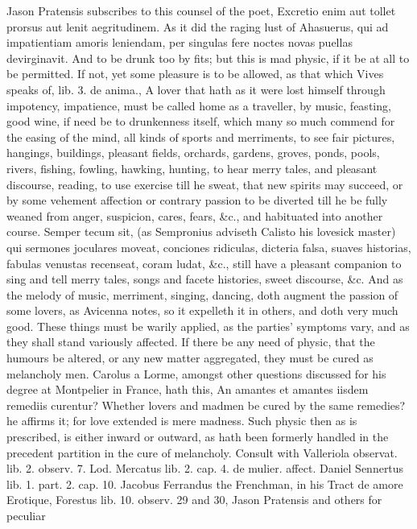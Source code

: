 {Jason Pratensis subscribes to this counsel of the poet, Excretio
enim aut tollet prorsus aut lenit aegritudinem. As it did the raging
lust of Ahasuerus, qui ad impatientiam amoris leniendam, per
singulas fere noctes novas puellas devirginavit. And to be drunk too by
fits; but this is mad physic, if it be at all to be permitted. If not,
yet some pleasure is to be allowed, as that which Vives speaks of, lib.
3. de anima., A lover that hath as it were lost himself through
impotency, impatience, must be called home as a traveller, by music,
feasting, good wine, if need be to drunkenness itself, which many so
much commend for the easing of the mind, all kinds of sports and
merriments, to see fair pictures, hangings, buildings, pleasant fields,
orchards, gardens, groves, ponds, pools, rivers, fishing, fowling,
hawking, hunting, to hear merry tales, and pleasant discourse, reading,
to use exercise till he sweat, that new spirits may succeed, or by some
vehement affection or contrary passion to be diverted till he be fully
weaned from anger, suspicion, cares, fears, \&c., and habituated into
another course. Semper tecum sit, (as Sempronius adviseth Calisto
his lovesick master) qui sermones joculares moveat, conciones
ridiculas, dicteria falsa, suaves historias, fabulas venustas
recenseat, coram ludat, \&c., still have a pleasant companion to sing
and tell merry tales, songs and facete histories, sweet discourse, \&c.
And as the melody of music, merriment, singing, dancing, doth augment
the passion of some lovers, as  Avicenna notes, so it expelleth
it in others, and doth very much good. These things must be warily
applied, as the parties' symptoms vary, and as they shall stand
variously affected.
If there be any need of physic, that the humours be altered, or any new
matter aggregated, they must be cured as melancholy men. Carolus a
Lorme, amongst other questions discussed for his degree at Montpelier
in France, hath this, An amantes et amantes iisdem remediis curentur?
Whether lovers and madmen be cured by the same remedies? he affirms it;
for love extended is mere madness. Such physic then as is prescribed,
is either inward or outward, as hath been formerly handled in the
precedent partition in the cure of melancholy. Consult with Valleriola
observat. lib. 2. observ. 7. Lod. Mercatus lib. 2. cap. 4. de mulier.
affect. Daniel Sennertus lib. 1. part. 2. cap. 10. Jacobus
Ferrandus the Frenchman, in his Tract de amore Erotique, Forestus lib.
10. observ. 29 and 30, Jason Pratensis and others for peculiar
}
